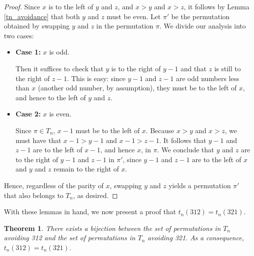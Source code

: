 \documentclass[11pt,letterpaper,twoside,english]{article}
\theoremstyle{theorem}
\newtheorem{theorem}{Theorem}[section]
\theoremstyle{remark}
\begin{document}
\begin{proof}
Since $x$ is to the left of $y$ and $z$, and $x>y$ and $x>z$, it follows by Lemma \ref{tn_avoidance} that both $y$ and $z$ must be even. Let $\pi'$ be the permutation obtained by swapping $y$ and $z$ in the permutation $\pi$. We divide our analysis into two cases:
\begin{itemize}
\item \textbf{Case 1:} $x$ is odd.

Then it suffices to check that $y$ is to the right of $y-1$ and that $z$ is still to the right of $z-1$. This is easy: since $y-1$ and $z-1$ are odd numbers less than $x$ (another odd number, by assumption), they must be to the left of $x$, and hence to the left of $y$ and $z$.

\item \textbf{Case 2:} $x$ is even.

Since $\pi\in T_n$, $x-1$ must be to the left of $x$. Because $x>y$ and $x>z$, we must have that $x-1>y-1$ and $x-1>z-1$. It follows that $y-1$ and $z-1$ are to the left of $x-1$, and hence $x$, in $\pi$. We conclude that $y$ and $z$ are to the right of $y-1$ and $z-1$ in $\pi'$, since $y-1$ and $z-1$ are to the left of $x$ and $y$ and $z$ remain to the right of $x$.
\end{itemize}
Hence, regardless of the parity of $x$, swapping $y$ and $z$ yields a permutation $\pi'$ that also belongs to $T_n$, as desired.
\end{proof}

With these lemmas in hand, we now present a proof that $t_n(312) = t_n(321)$.

\begin{theorem}
There exists a bijection between the set of permutations in $T_n$ avoiding 312 and the set of permutations in $T_n$ avoiding 321. As a consequence, $t_n(312)=t_n(321)$.
\end{theorem}
\end{document}
